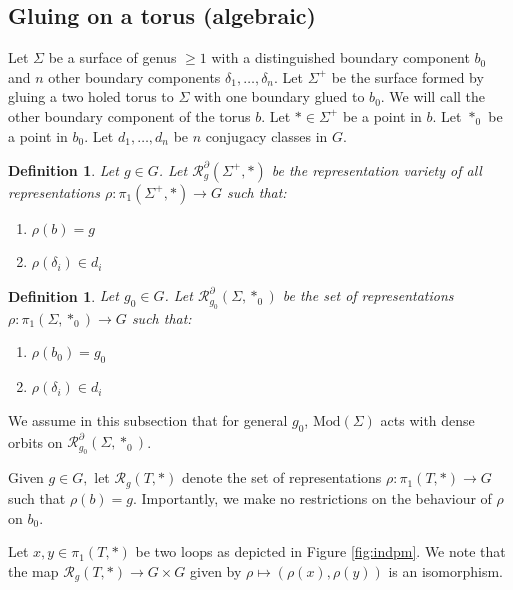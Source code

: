 \documentclass{article}
\newcommand{\Rc}{\mathcal{R}}
\newcommand{\Mod}{\textrm{Mod}}
\newtheorem{definition}[theorem]{Definition}
\begin{document}

\subsection{Gluing on a torus (algebraic)}\label{gluetor}
    Let $\Sigma $ be a surface of genus $\ge 1$ with a distinguished boundary component $b_0$ and $n$ other boundary components $\delta_1, \dots, \delta_n$. Let $\Sigma^+$ be the surface formed by gluing a two holed torus to $\Sigma$ with one boundary glued to $b_0$. We will call the other boundary component of the torus $b$. Let $* \in \Sigma^+$ be a point in $b$. Let $*_0$ be a point in $b_0$. Let $d_1, \dots, d_n$ be $n$ conjugacy classes in $G$. 
    
    \begin{definition}
        Let $g \in G$. Let $\Rc^{\partial}_g (\Sigma^+,*)$ be the representation variety of all representations $\rho : \pi_1(\Sigma^+, * ) \to G$ such that:
    \begin{enumerate}
        \item $\rho(b) =g$
        \item $\rho(\delta_i) \in d_i$
    \end{enumerate}
    
    \end{definition}

\begin{definition}
        Let $g_0 \in G$. Let $\Rc^{\partial}_{g_0}(\Sigma,*_0)$ be the set of representations $\rho: \pi_1(\Sigma, *_0) \to G$ such that:
    \begin{enumerate}
        \item $\rho(b_0) =g_0$
        \item $\rho(\delta_i) \in d_i$
    \end{enumerate}
\end{definition}
    


    We assume in this subsection that for general $g_0$, $\Mod(\Sigma)$ acts with dense orbits on  $\Rc^{\partial}_{g_0}(\Sigma,*_0)$.

    Given $g \in G,$ let $\Rc_g(T,*)$ denote the set of representations $\rho:\pi_1(T, *) \to G$ such that $\rho(b) =g.$ Importantly, we make no restrictions on the behaviour of $\rho$ on $b_0.$
    
    Let $x,y \in \pi_1(T, *)$ be two loops as depicted in Figure \ref{fig:indpm}.
    We note that the map $\Rc_g(T ,*) \to G \times G$ given by $\rho \mapsto (\rho(x), \rho(y))$ is an isomorphism.
\end{document}
